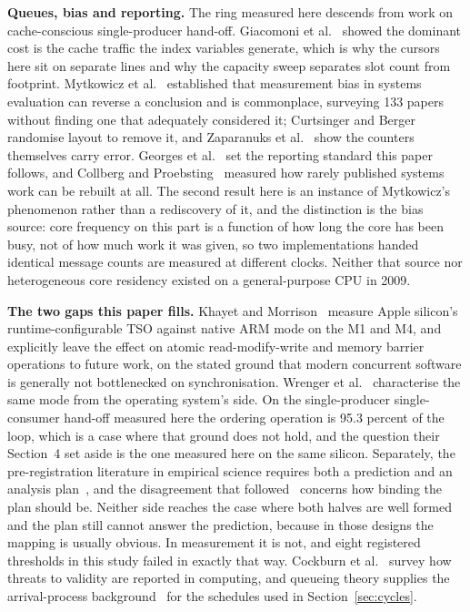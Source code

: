 \documentclass[conference]{IEEEtran}
\begin{document}
\textbf{Queues, bias and reporting.} The ring measured here descends from work
on cache-conscious single-producer hand-off. Giacomoni et
al.~\cite{giacomoni2008fastforward} showed the dominant cost is the cache
traffic the index variables generate, which is why the cursors here sit on
separate lines and why the capacity sweep separates slot count from footprint.
Mytkowicz et al.~\cite{mytkowicz2009wrong} established that measurement bias in
systems evaluation can reverse a conclusion and is commonplace, surveying 133
papers without finding one that adequately considered it; Curtsinger and
Berger~\cite{curtsinger2013stabilizer} randomise layout to remove it, and
Zaparanuks et al.~\cite{zaparanuks2009accuracy} show the counters themselves
carry error. Georges et al.~\cite{georges2007statistically} set the
reporting standard this paper follows, and Collberg and Proebsting~\cite{collberg2016repeatability} measured
how rarely published systems work can be rebuilt at all. The second result here
is an instance of Mytkowicz's phenomenon rather than a rediscovery of it, and
the distinction is the bias source: core frequency on this part is a function
of how long the core has been busy, not of how much work it was given, so two
implementations handed identical message counts are measured at different
clocks. Neither that source nor heterogeneous core residency existed on a
general-purpose CPU in 2009.

\textbf{The two gaps this paper fills.} Khayet and
Morrison~\cite{khayet2026arm} measure Apple silicon's runtime-configurable TSO
against native ARM mode on the M1 and M4, and explicitly leave the effect on
atomic read-modify-write and memory barrier operations to future work, on the
stated ground that modern concurrent software is generally not bottlenecked on
synchronisation. Wrenger et al.~\cite{wrenger2023tosting, wrenger2024m1}
characterise the same mode from the operating system's side. On the
single-producer single-consumer hand-off measured here the ordering operation
is 95.3 percent of the loop, which is a case where that ground does not hold,
and the question their Section~4 set aside is the one measured here on the same
silicon. Separately, the pre-registration literature in empirical science
requires both a prediction and an analysis plan~\cite{nosek2018preregistration},
and the disagreement that followed~\cite{ledgerwood2018distinguish,
nosek2018reply} concerns how binding the plan should be. Neither side reaches
the case where both halves are well formed and the plan still cannot answer the
prediction, because in those designs the mapping is usually obvious. In
measurement it is not, and eight registered thresholds in this study failed in
exactly that way. Cockburn et al.~\cite{cockburn2020threats} survey how threats
to validity are reported in computing, and queueing theory supplies the
arrival-process background~\cite{kingman1961heavy, kingman1962queues,
hawkes1971spectra, ogata1981thinning} for the schedules used in
Section~\ref{sec:cycles}.
\end{document}
